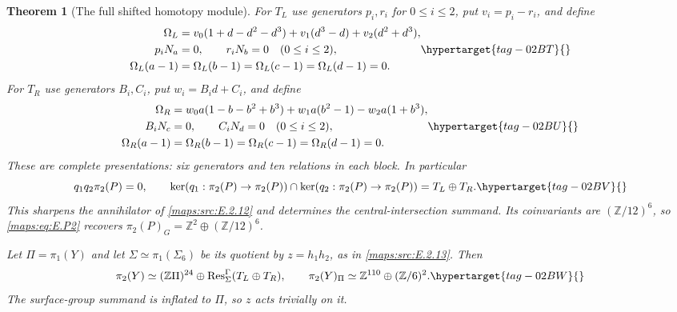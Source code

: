 \documentclass[11pt,a4paper]{article}
\numberwithin{equation}{section}
\newtheorem{theorem}{Theorem}[section]
\theoremstyle{definition}
\begin{document}
\begin{theorem}[The full shifted homotopy module]
For $T_L$ use generators $p_i,r_i$ for $0\leq i\leq2$,
put $v_i=p_i-r_i$, and define
\begin{equation}
 \begin{split}
 \Omega_L={}&v_0(1+d-d^2-d^3)
       +v_1(d^3-d)+v_2(d^2+d^3),\\
 p_iN_a={}&0,\qquad r_iN_b=0\quad(0\leq i\leq2),\\
 \Omega_L(a-1)={}&\Omega_L(b-1)
       =\Omega_L(c-1)=\Omega_L(d-1)=0.
 \end{split}
 \hypertarget{tag-02BT}{}\label{maps:eq:E.P3}
\end{equation}
For $T_R$ use generators $B_i,C_i$, put $w_i=B_id+C_i$,
and define
\begin{equation}
 \begin{split}
 \Omega_R={}&w_0a(1-b-b^2+b^3)
              +w_1a(b^2-1)-w_2a(1+b^3),\\
 B_iN_c={}&0,\qquad C_iN_d=0\quad(0\leq i\leq2),\\
 \Omega_R(a-1)={}&\Omega_R(b-1)
       =\Omega_R(c-1)=\Omega_R(d-1)=0.
 \end{split}
 \hypertarget{tag-02BU}{}\label{maps:eq:E.P4}
\end{equation}
These are complete presentations: six generators and
ten relations in each block. In particular
\begin{equation}
 q_1q_2\pi_2(P)=0,\qquad
 \ker(q_1:\pi_2(P)\to\pi_2(P))
  \cap\ker(q_2:\pi_2(P)\to\pi_2(P))=T_L\oplus T_R.
 \hypertarget{tag-02BV}{}\label{maps:eq:E.P5}
\end{equation}
This sharpens the annihilator of \cref{maps:src:E.2.12} and determines the central-intersection summand.
Its coinvariants are $(\mathbb Z/12)^6$, so \eqref{maps:eq:E.P2}
recovers $\pi_2(P)_G=\mathbb Z^2\oplus(\mathbb Z/12)^6$.

Let $\Pi=\pi_1(Y)$ and let $\Sigma\simeq\pi_1(\Sigma_6)$
be its quotient by $z=h_1h_2$, as in \ref{maps:src:E.2.13}. Then
\begin{equation}
 \pi_2(Y)\simeq(\mathbb Z\Pi)^{24}
          \oplus\operatorname{Res}^{\Gamma}_{\Sigma}(T_L\oplus T_R),
 \qquad
 \pi_2(Y)_\Pi\simeq\mathbb Z^{110}\oplus(\mathbb Z/6)^2.
 \hypertarget{tag-02BW}{}\label{maps:eq:E.P6}
\end{equation}
The surface-group summand is inflated to $\Pi$, so
$z$ acts trivially on it. \end{theorem}
\end{document}
